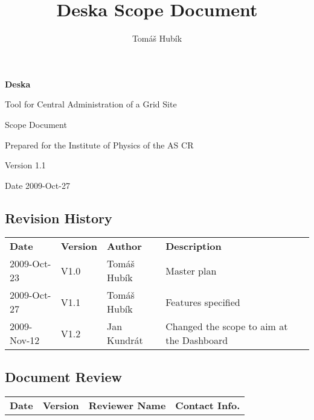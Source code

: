 \documentclass[12pt]{article}
\author{Tomáš Hubík}
\title{Deska Scope Document}
\begin{document}
{\Huge \textbf{Deska}}

\vspace{0.2in}

{\large Tool for Central Administration of a Grid Site}

\vspace{0.5in}

{\large Scope Document}

\vspace{0.2in}

{\large Prepared for the Institute of Physics of the AS CR}

\vspace{0.2in}

{\large Version 1.1}

\vspace{0.2in}

{\large Date 2009-Oct-27}

\vspace{0.5in}

\subsection*{Revision History}

\begin{table}[!h]
	\begin{tabular}{l l l l}
		\textbf{Date} & \textbf{Version} & \textbf{Author} & \textbf{Description} \\
		2009-Oct-23 & V1.0 & Tomáš Hubík & Master plan \\
		2009-Oct-27 & V1.1 & Tomáš Hubík & Features specified \\
		2009-Nov-12 & V1.2 & Jan Kundrát & Changed the scope to aim at the
        Dashboard \\
	\end{tabular}
	\label{tab:RevisionHistory}
\end{table}


\subsection*{Document Review}

\begin{table}[!h]
	\begin{tabular}{l l l l}
		\textbf{Date} & \textbf{Version} & \textbf{Reviewer Name} & \textbf{Contact Info.} \\
	\end{tabular}
	\label{tab:DocumentReview}
\end{table}
\end{document}

